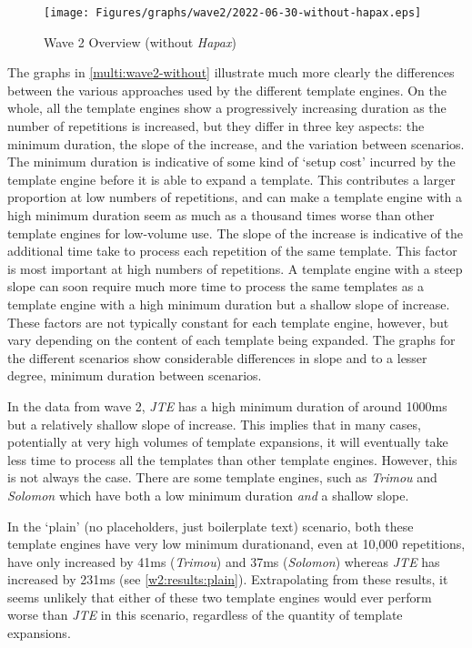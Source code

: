 \begin{figure}[ht!]
\centering
\texttt{[image: Figures/graphs/wave2/2022-06-30-without-hapax.eps]}
\caption{\label{multi:wave2-without}Wave 2 Overview (without \emph{Hapax})}
\end{figure}

The graphs in \autoref{multi:wave2-without} illustrate much more clearly the differences between the various approaches used by the different template engines. On the whole, all the template engines show a progressively increasing duration as the number of repetitions is increased, but they differ in three key aspects: the minimum duration, the slope of the increase, and the variation between scenarios. The minimum duration is indicative of some kind of `setup cost' incurred by the template engine before it is able to expand a template. This contributes a larger proportion at low numbers of repetitions, and can make a template engine with a high minimum duration seem as much as a thousand times worse than other template engines for low-volume use. The slope of the increase is indicative of the additional time take to process each repetition of the same template. This factor is most important at high numbers of repetitions. A template engine with a steep slope can soon require much more time to process the same templates as a template engine with a high minimum duration but a shallow slope of increase. These factors are not typically constant for each template engine, however, but vary depending on the content of each template being expanded. The graphs for the different scenarios show considerable differences in slope and to a lesser degree, minimum duration between scenarios.

In the data from wave 2, \emph{JTE} has a high minimum duration of around 1000ms but a relatively shallow slope of increase. This implies that in many cases, potentially at very high volumes of template expansions, it will eventually take less time to process all the templates than other template engines. However, this is not always the case. There are some template engines, such as \emph{Trimou} and \emph{Solomon} which have both a low minimum duration \emph{and} a shallow slope.

In the `plain' (no placeholders, just boilerplate text) scenario, both these template engines have very low minimum durationand, even at 10,000 repetitions, have only increased by 41ms (\emph{Trimou}) and 37ms (\emph{Solomon}) whereas \emph{JTE} has increased by 231ms (see \autoref{w2:results:plain}). Extrapolating from these results, it seems unlikely that either of these two template engines would ever perform worse than \emph{JTE} in this scenario, regardless of the quantity of template expansions.


